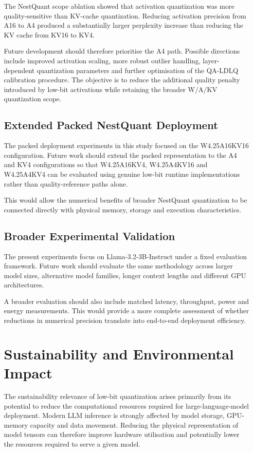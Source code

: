 The NestQuant scope ablation showed that activation quantization was more
quality-sensitive than KV-cache quantization. Reducing activation
precision from A16 to A4 produced a substantially larger perplexity
increase than reducing the KV cache from KV16 to KV4.

Future development should therefore prioritise the A4 path. Possible
directions include improved activation scaling, more robust outlier
handling, layer-dependent quantization parameters and further
optimisation of the QA-LDLQ calibration procedure. The objective is to
reduce the additional quality penalty introduced by low-bit activations
while retaining the broader W/A/KV quantization scope.


\subsection{Extended Packed NestQuant Deployment}

The packed deployment experiments in this study focused on the
W4.25A16KV16 configuration. Future work should extend the packed
representation to the A4 and KV4 configurations so that
W4.25A16KV4, W4.25A4KV16 and W4.25A4KV4 can be evaluated using genuine
low-bit runtime implementations rather than quality-reference paths
alone.

This would allow the numerical benefits of broader NestQuant
quantization to be connected directly with physical memory, storage and
execution characteristics.


\subsection{Broader Experimental Validation}

The present experiments focus on Llama-3.2-3B-Instruct under a fixed
evaluation framework. Future work should evaluate the same methodology
across larger model sizes, alternative model families, longer context
lengths and different GPU architectures.

A broader evaluation should also include matched latency, throughput,
power and energy measurements. This would provide a more complete
assessment of whether reductions in numerical precision translate into
end-to-end deployment efficiency.


\section{Sustainability and Environmental Impact}
The sustainability relevance of low-bit quantization arises primarily
from its potential to reduce the computational resources required for
large-language-model deployment\cite{Luccioni_2024}. Modern LLM inference is strongly
affected by model storage, GPU-memory capacity and data movement.
Reducing the physical representation of model tensors can therefore
improve hardware utilisation and potentially lower the resources
required to serve a given model.


